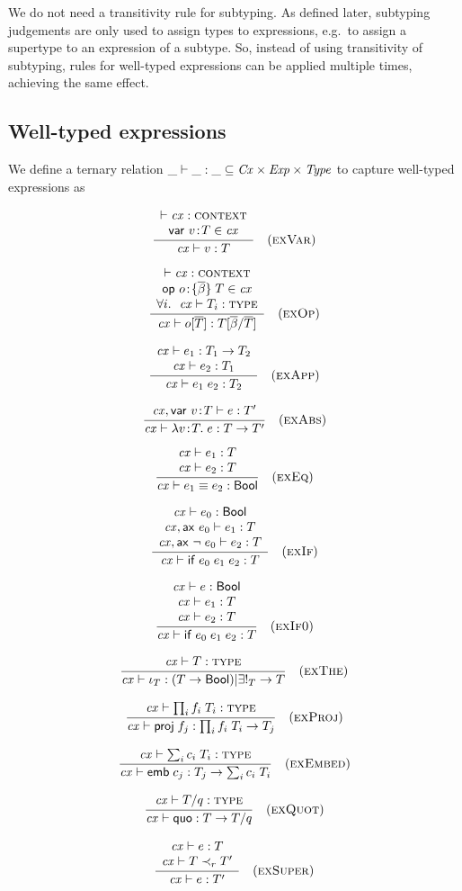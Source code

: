 We do not need a transitivity rule for subtyping. As defined later, subtyping
judgements are only used to assign types to expressions, e.g.\ to assign a
supertype to an expression of a subtype. So, instead of using transitivity of
subtyping, rules for well-typed expressions can be applied multiple times,
achieving the same effect.

\subsection{Well-typed expressions}

We define a ternary relation $\ternrel{\hastyY}{\Cx}{\Expr}{\Typ}$ to capture
well-typed expressions as

\[
\rruleII
 {\cxwfO}
 {\vdecO\in\cx}
 {\hastyO{\var}{\typ}}
 {\Revar}
\]

\[
\rruleIII
 {\cxwfO}
 {\odecO\in\cx}
 {\FORALL{i}{\istyO{\typ_i}}}
 {\hastyO{\opO}{\tsbslash{\typ}{\tvarS}{\typS}}}
 {\Reop}
\]

\[
\rruleII
 {\hastyO{\expr_1}{\tarrO}}
 {\hastyO{\expr_2}{\typ_1}}
 {\hastyO{\appO}{\typ_2}}
 {\Reapp}
\]

\[
\rruleI
 {\hasty{\snoc{\cx}{\vdecO}}{\expr}{\typ'}}
 {\hastyO{\absO}{\tarr{\typ}{\typ'}}}
 {\Reabs}
\]

\[
\rruleII
 {\hastyO{\expr_1}{\typ}}
 {\hastyO{\expr_2}{\typ}}
 {\hastyO{\eqO}{\bool}}
 {\Reeq}
\]

\[
\rruleIII
 {\hastyO{\expr_0}{\bool}}
 {\hasty{\snoc{\cx}{\axM{\expr_0}}}{\expr_1}{\typ}}
 {\hasty{\snoc{\cx}{\axM{\nega{\expr_0}}}}{\expr_2}{\typ}}
 {\hastyO{\iifO}{\typ}}
 {\Reif}
\]

\[
\rruleIII
 {\hastyO{\expr}{\bool}}
 {\hastyO{\expr_1}{\typ}}
 {\hastyO{\expr_2}{\typ}}
 {\hastyO{\iifO}{\typ}}
 {\ReifO}
\]

\[
\rruleI
 {\istyO{\typ}}
 {\hastyO{\descopO}{\tarr{\tsub{(\tarr{\typ}{\bool})}{\exIopO}}{\typ}}}
 {\Redesc}
\]

\[
\rruleI
 {\istyO{\trecO}}
 {\hastyO{\pjopO}{\tarr{\trecO}{\typ_j}}}
 {\Reproj}
\]

\[
\rruleI 
 {\istyO{\tsumO}}
 {\hastyO{\embO}{\tarr{\typ_j}{\tsumO}}}
 {\Reembed}
\]

\[
\rruleI
 {\istyO{\tquotO}}
 {\hastyO{\quo}{\tarr{\typ}{\tquotO}}}
 {\Requot}
\]


\[
\rruleII
 {\hastyO{\expr}{\typ}}
 {\issubO{\typ}{\tspred}{\typ'}}
 {\hastyO{\expr}{\typ'}}
 {\Resuper}
\]

